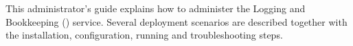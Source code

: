 This administrator's guide explains how to administer the Logging and
Bookkeeping (\LB) service. Several deployment scenarios are described together
with the installation, configuration, running and troubleshooting steps. 

